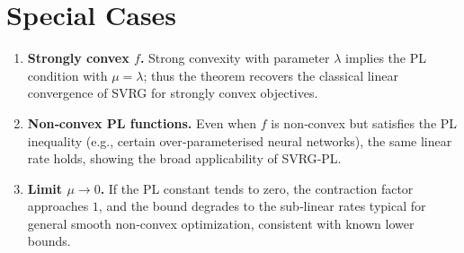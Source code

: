 \documentclass{article}
\begin{document}
\section*{Special Cases}
\begin{enumerate}
\item \textbf{Strongly convex $f$.} Strong convexity with parameter $\lambda$ implies the PL condition with $\mu=\lambda$; thus the theorem recovers the classical linear convergence of SVRG for strongly convex objectives.
\item \textbf{Non‑convex PL functions.} Even when $f$ is non‑convex but satisfies the PL inequality (e.g., certain over‑parameterised neural networks), the same linear rate holds, showing the broad applicability of SVRG‑PL.
\item \textbf{Limit $\mu\to0$.} If the PL constant tends to zero, the contraction factor approaches $1$, and the bound degrades to the sub‑linear rates typical for general smooth non‑convex optimization, consistent with known lower bounds.
\end{enumerate}
\end{document}

